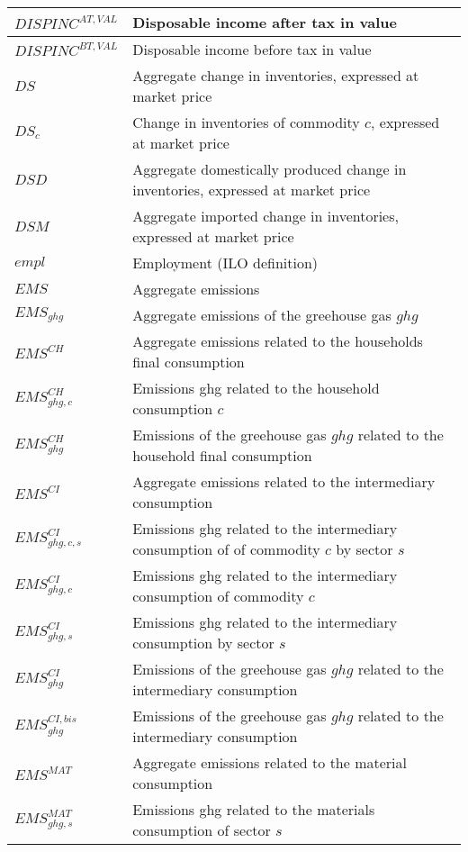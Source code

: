 \documentclass[12pt]{article}
\numberwithin{equation}{section}
\begin{document}
\begin{longtable}{@{}p{4cm}p{9cm}@{}}
 \midrule 
$DISPINC^{AT,VAL}$ & Disposable income after tax in value \\
 \midrule 
$DISPINC^{BT,VAL}$ & Disposable income before tax in value \\
 \midrule 
$DS$ & Aggregate change in inventories, expressed at market price \\
 \midrule 
$DS_{c}$ & Change in inventories of commodity $c$, expressed at market price \\
 \midrule 
$DSD$ & Aggregate domestically produced change in inventories, expressed at market price \\
 \midrule 
$DSM$ & Aggregate imported change in inventories, expressed at market price \\
 \midrule 
$empl$ & Employment (ILO definition) \\
 \midrule 
$EMS$ & Aggregate emissions \\
 \midrule 
$EMS_{ghg}$ & Aggregate emissions of the greehouse gas $ghg$ \\
 \midrule 
$EMS^{CH}$ & Aggregate emissions related to the households final consumption \\
 \midrule 
$EMS^{CH}_{ghg, c}$ & Emissions ghg related to the household consumption $c$ \\
 \midrule 
$EMS^{CH}_{ghg}$ & Emissions of the greehouse gas $ghg$ related to the household final consumption \\
 \midrule 
$EMS^{CI}$ & Aggregate emissions related to the intermediary consumption \\
 \midrule 
$EMS^{CI}_{ghg, c, s}$ & Emissions ghg related to the intermediary consumption of of commodity $c$ by sector $s$ \\
 \midrule 
$EMS^{CI}_{ghg, c}$ & Emissions ghg related to the intermediary consumption of commodity $c$ \\
 \midrule 
$EMS^{CI}_{ghg, s}$ & Emissions ghg related to the intermediary consumption by sector $s$ \\
 \midrule 
$EMS^{CI}_{ghg}$ & Emissions of the greehouse gas $ghg$ related to the intermediary consumption \\
 \midrule 
$EMS^{CI,bis}_{ghg}$ & Emissions of the greehouse gas $ghg$ related to the intermediary consumption \\
 \midrule 
$EMS^{MAT}$ & Aggregate emissions related to the material consumption \\
 \midrule 
$EMS^{MAT}_{ghg, s}$ & Emissions ghg related to the  materials consumption of sector $s$ \\

\end{longtable}
\end{document}
